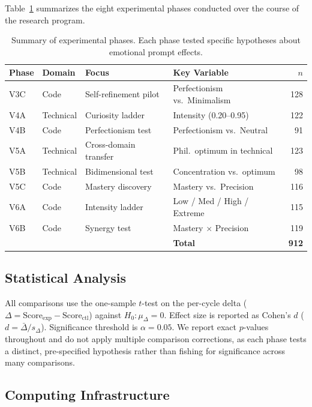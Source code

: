 \documentclass[lineno]{wlpeerj}
\begin{document}
Table~\ref{tab:phases} summarizes the eight experimental phases conducted over the course of the research program.

\begin{table}[H]
\centering
\caption{Summary of experimental phases. Each phase tested specific hypotheses about emotional prompt effects.}
\label{tab:phases}
\small
\begin{tabular}{@{}llllr@{}}
\toprule
\textbf{Phase} & \textbf{Domain} & \textbf{Focus} & \textbf{Key Variable} & \textbf{$n$} \\
\midrule
V3C & Code & Self-refinement pilot & Perfectionism vs.\ Minimalism & 128 \\
V4A & Technical & Curiosity ladder & Intensity (0.20--0.95) & 122 \\
V4B & Code & Perfectionism test & Perfectionism vs.\ Neutral & 91 \\
V5A & Technical & Cross-domain transfer & Phil.\ optimum in technical & 123 \\
V5B & Technical & Bidimensional test & Concentration vs.\ optimum & 98 \\
V5C & Code & Mastery discovery & Mastery vs.\ Precision & 116 \\
V6A & Code & Intensity ladder & Low / Med / High / Extreme & 115 \\
V6B & Code & Synergy test & Mastery $\times$ Precision & 119 \\
\midrule
 & & & \textbf{Total} & \textbf{912} \\
\bottomrule
\end{tabular}
\end{table}

\subsection{Statistical Analysis}

All comparisons use the one-sample $t$-test on the per-cycle delta ($\Delta = \text{Score}_{\text{exp}} - \text{Score}_{\text{ctl}}$) against $H_0: \mu_\Delta = 0$. Effect size is reported as Cohen's $d$ ($d = \bar{\Delta} / s_{\Delta}$). Significance threshold is $\alpha = 0.05$. We report exact $p$-values throughout and do not apply multiple comparison corrections, as each phase tests a distinct, pre-specified hypothesis rather than fishing for significance across many comparisons.

\subsection{Computing Infrastructure}
\end{document}
